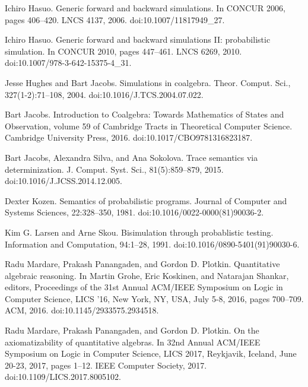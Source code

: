 \par\noindent  [32]  Ichiro Hasuo.  Generic forward and backward simulations.  In CONCUR 2006, pages 406–420. LNCS 4137, 2006.  doi:10.1007/11817949\_27.  
 
\par\noindent  [33]  Ichiro Hasuo.  Generic forward and backward simulations II: probabilistic simulation.  In CONCUR 2010, pages 447–461. LNCS 6269, 2010.  doi:10.1007/978-3-642-15375-4\_31.  
 
\par\noindent  [34]  Jesse Hughes and Bart Jacobs.  Simulations in coalgebra.  Theor. Comput. Sci., 327(1-2):71–108, 2004.  doi:10.1016/J.TCS.2004.07.022.  
 
\par\noindent  [35]  Bart Jacobs.  Introduction to Coalgebra: Towards Mathematics of States and Observation, volume 59 of Cambridge Tracts in Theoretical Computer Science.  Cambridge University Press, 2016.  doi:10.1017/CBO9781316823187.  
 
\par\noindent  [36]  Bart Jacobs, Alexandra Silva, and Ana Sokolova.  Trace semantics via determinization.  J. Comput. Syst. Sci., 81(5):859–879, 2015.  doi:10.1016/J.JCSS.2014.12.005.  
 
\par\noindent  [37]  Dexter Kozen.  Semantics of probabilistic programs.  Journal of Computer and Systems Sciences, 22:328–350, 1981.  doi:10.1016/0022-0000(81)90036-2.  
 
\par\noindent  [38]  Kim G. Larsen and Arne Skou.  Bisimulation through probablistic testing.  Information and Computation, 94:1–28, 1991.  doi:10.1016/0890-5401(91)90030-6.  
 
\par\noindent  [39]  Radu Mardare, Prakash Panangaden, and Gordon D. Plotkin.  Quantitative algebraic reasoning.  In Martin Grohe, Eric Koskinen, and Natarajan Shankar, editors, Proceedings of the 31st Annual ACM/IEEE Symposium on Logic in Computer Science, LICS ’16, New York, NY, USA, July 5-8, 2016, pages 700–709. ACM, 2016.  doi:10.1145/2933575.2934518.  
 
\par\noindent  [40]  Radu Mardare, Prakash Panangaden, and Gordon D. Plotkin.  On the axiomatizability of quantitative algebras.  In 32nd Annual ACM/IEEE Symposium on Logic in Computer Science, LICS 2017, Reykjavik, Iceland, June 20-23, 2017, pages 1–12. IEEE Computer Society, 2017.  doi:10.1109/LICS.2017.8005102.  
 
